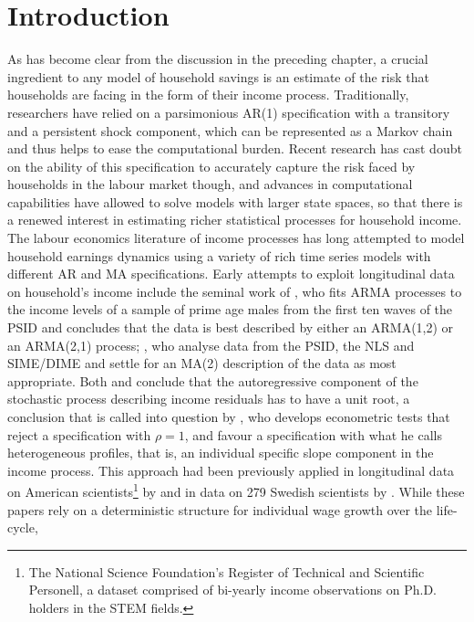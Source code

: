 \section{Introduction}
As has become clear from the discussion in the preceding chapter, a crucial
ingredient to any model of household savings is an estimate of the risk that
households are facing in the form of their income process. Traditionally,
researchers have relied on a parsimonious AR(1) specification with a transitory
and a persistent shock component, which can be represented as a Markov chain
and thus helps to ease the computational burden. Recent research has cast doubt
on the ability of this specification to accurately capture the risk faced by
households in the labour market though, and advances in computational
capabilities have allowed to solve models with larger state spaces, so that
there is a renewed interest in estimating richer statistical processes for
household income. \vspace{1cm}
\\
The labour economics literature of income processes has long attempted to model
household earnings dynamics using a variety of rich time series models with 
different AR and MA specifications. Early attempts to exploit longitudinal data
on household's income include the seminal work of \citet{MaCurdy1982}, who fits
ARMA processes to the income levels of a sample of prime age males from the first
ten waves of the PSID and concludes that the data is best described by either an
ARMA(1,2) or an ARMA(2,1) process; \citet{AbowdCard89}, who analyse data from the
PSID, the NLS and SIME/DIME and settle for an MA(2) description of the data as
most appropriate. Both \cite{MaCurdy1982} and \citet{AbowdCard89} conclude that 
the autoregressive component of the stochastic process describing income 
residuals has to have a unit root, a conclusion that is called into question by
\citet{Baker1997}, who develops econometric tests that reject a specification 
with $\rho=1$, and favour a specification with what he calls heterogeneous 
profiles, that is, an individual specific slope component in the income process.
This approach had been previously applied in longitudinal data on American 
scientists\footnote{The National Science Foundation's Register of Technical and
Scientific Personell, a dataset comprised of bi-yearly income observations on 
Ph.D. holders in the STEM fields.} by \citet{LillardWeiss1978} and in data on 279
Swedish scientists by \citet{Hause1980}. While these papers rely on a deterministic
structure for individual wage growth over the life-cycle, \citet{Guvenen2009}
